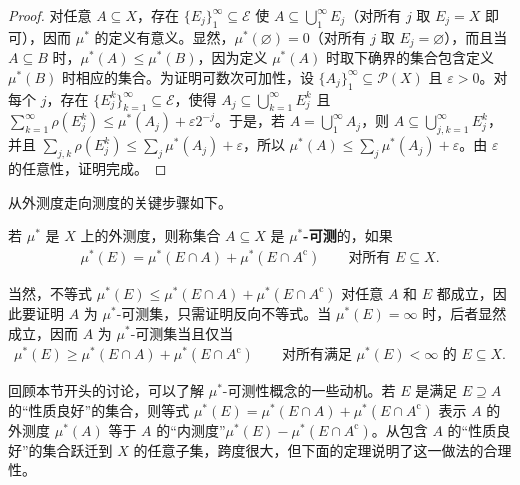 \documentclass[../../main.tex]{subfiles}%
\begin{document}
\begin{proof}
对任意 $A\subseteq X$，存在 $\{E_j\}_1^\infty\subseteq\mathscr{E}$ 使 $A\subseteq\bigcup_1^\infty E_j$（对所有 $j$ 取 $E_j=X$ 即可），因而 $\mu^*$ 的定义有意义。显然，$\mu^*(\varnothing)=0$（对所有 $j$ 取 $E_j=\varnothing$），而且当 $A\subseteq B$ 时，$\mu^*(A)\leqslant\mu^*(B)$，因为定义 $\mu^*(A)$ 时取下确界的集合包含定义 $\mu^*(B)$ 时相应的集合。为证明可数次可加性，设 $\{A_j\}_1^\infty\subseteq\mathscr{P}(X)$ 且 $\varepsilon>0$。对每个 $j$，存在 $\{E_j^k\}_{k=1}^\infty\subseteq\mathscr{E}$，使得 $A_j\subseteq\bigcup_{k=1}^\infty E_j^k$ 且 $\sum_{k=1}^\infty\rho(E_j^k)\leqslant\mu^*(A_j)+\varepsilon2^{-j}$。于是，若 $A=\bigcup_1^\infty A_j$，则 $A\subseteq\bigcup_{j,k=1}^\infty E_j^k$，并且 $\sum_{j,k}\rho(E_j^k)\leqslant\sum_j\mu^*(A_j)+\varepsilon$，所以 $\mu^*(A)\leqslant\sum_j\mu^*(A_j)+\varepsilon$。由 $\varepsilon$ 的任意性，证明完成。
\end{proof}

从外测度走向测度的关键步骤如下。
\begin{definition}[$\mu^*$-可测集]\label{definition:ch01-caratheodory-measurability}
若 $\mu^*$ 是 $X$ 上的外测度，则称集合 $A\subseteq X$ 是 \textbf{$\mu^*$-可测}的，如果
\begin{align*}
\mu^*(E)=\mu^*(E\cap A)+\mu^*(E\cap A^{\mathrm{c}})\qquad\text{对所有 }E\subseteq X.
\end{align*}
\end{definition}


\begin{remark}
当然，不等式 $\mu^*(E)\leqslant\mu^*(E\cap A)+\mu^*(E\cap A^{\mathrm{c}})$ 对任意 $A$ 和 $E$ 都成立，因此要证明 $A$ 为 $\mu^*$-可测集，只需证明反向不等式。当 $\mu^*(E)=\infty$ 时，后者显然成立，因而 $A$ 为 $\mu^*$-可测集当且仅当
\begin{align*}
\mu^*(E)\geqslant\mu^*(E\cap A)+\mu^*(E\cap A^{\mathrm{c}})\qquad\text{对所有满足 }\mu^*(E)<\infty\text{ 的 }E\subseteq X.
\end{align*}
\end{remark}


回顾本节开头的讨论，可以了解 $\mu^*$-可测性概念的一些动机。若 $E$ 是满足 $E\supseteq A$ 的“性质良好”的集合，则等式 $\mu^*(E)=\mu^*(E\cap A)+\mu^*(E\cap A^{\mathrm{c}})$ 表示 $A$ 的外测度 $\mu^*(A)$ 等于 $A$ 的“内测度”$\mu^*(E)-\mu^*(E\cap A^{\mathrm{c}})$。从包含 $A$ 的“性质良好”的集合跃迁到 $X$ 的任意子集，跨度很大，但下面的定理说明了这一做法的合理性。
\end{document}
